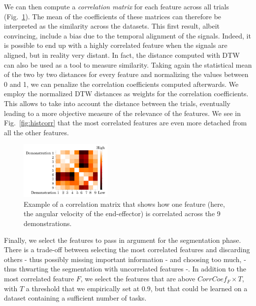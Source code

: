 \documentclass[a4paper, 10pt, conference]{ieeeconf}
\begin{document}
We can then compute a \textit{correlation matrix} for each feature across all trials (Fig.~\ref{fig:corrMat}). The mean of the coefficients of these matrices can therefore be interpreted as the similarity across the datasets. This first result, albeit convincing, include a bias due to the temporal alignment of the signals. Indeed, it is possible to end up with a highly correlated feature when the signals are aligned, but in reality very distant. In fact, the distance computed with DTW can also be used as a tool to measure similarity. Taking again the statistical mean of the two by two distances for every feature and normalizing the values between 0 and 1, we can penalize the correlation coefficients computed afterwards. We employ the normalized DTW distances as weights for the correlation coefficients. This allows to take into account the distance between the trials, eventually leading to a more objective measure of the relevance of the features. We see in Fig.~\ref{fig:histcorr} that the most correlated features are even more detached from all the other features.  

\begin{figure}[t]
  \centering
  \includegraphics[width=0.4\textwidth]{img/resolCorrMap.pdf}
  \caption{Example of a correlation matrix that shows how one feature (here, the angular velocity of the end-effector) is correlated across the 9 demonstrations.}
  \label{fig:corrMat}
\end{figure}

Finally, we select the features to pass in argument for the segmentation phase. There is a trade-off between selecting the most correlated features and discarding others - thus possibly missing important information - and choosing too much, - thus thwarting the segmentation with uncorrelated features -. In  addition to the most correlated feature $F$, we select the features that are above $CorrCoef_{F} \times T$, with $T$ a threshold that we empirically set at $0.9$, but that could be learned on a dataset containing a sufficient number of tasks. \newline
\end{document}
